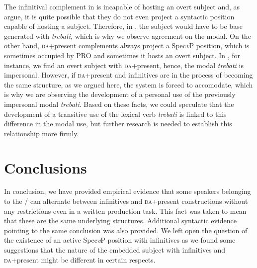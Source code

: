 \documentclass[output=paper,modfonts,newtxmath,hidelinks,]{langscibook}
\begin{document}

\noindent The infinitival complement in  is incapable of hosting an overt subject and, as \citet{TodorovicWurmbrand2015} argue, it is quite possible that they do not even project a syntactic position capable of hosting a subject. Therefore, in , the subject would have to be base generated with \textit{trebati,} which is why we observe agreement on the modal. On the other hand, \textsc{da}+present complements always project a Spec\textit{v}P position, which is sometimes occupied by PRO and sometimes it hosts an overt subject. In , for instance, we find an overt subject with \textsc{da}+present, hence, the modal \textit{trebati} is impersonal. However, if \textsc{da}+present and infinitives are in the process of becoming the same structure, as we argued here, the system is forced to accomodate, which is why we are observing the development of a personal use of the previously impersonal modal \textit{trebati}. Based on these facts, we could speculate that the development of a transitive use of the lexical verb \textit{trebati} is linked to this difference in the modal use, but further research is needed to establish this relationship more firmly.

\section{Conclusions}\label{7:s5}

In conclusion, we have provided empirical evidence that some speakers belonging to the /  can alternate between infinitives and \textsc{da}+present constructions without any restrictions even in a written production task. This fact was taken to mean that these are the same underlying structures. Additional syntactic evidence pointing to the same conclusion was also provided. We left open the question of the existence of an active Spec\textit{v}P position with infinitives as we found some suggestions that the nature of the embedded subject with infinitives and \textsc{da}+present might be different in certain respects.
\end{document}

